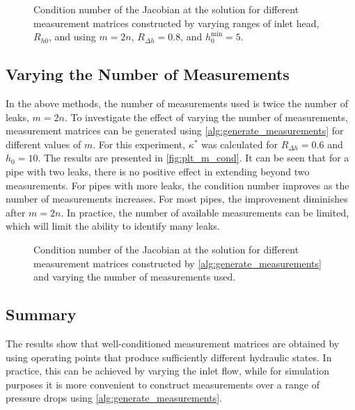 \begin{figure}[ht]
    \centering
    
    \caption[Condition number at the solution for different ranges of inlet head]{Condition number of the Jacobian at the solution for different measurement matrices constructed by varying ranges of inlet head, $R_{h0}$, and using $m=2n$, $R_{\Delta h}=0.8$, and $h_0^{\min}=5$.}
    \label{fig:plt_Rh0_cond}
\end{figure}

\subsection{Varying the Number of Measurements}

In the above methods, the number of measurements used is twice the number of leaks, $m=2n$. To investigate the effect of varying the number of measurements, measurement matrices can be generated using \autoref{alg:generate_measurements} for different values of $m$. For this experiment, $\kappa^*$ was calculated for $R_{\Delta h} = 0.6$ and $h_0=10$. The results are presented in \autoref{fig:plt_m_cond}. It can be seen that for a pipe with two leaks, there is no positive effect in extending beyond two measurements. For pipes with more leaks, the condition number improves as the number of measurements increases. For most pipes, the improvement diminishes after $m=2n$. In practice, the number of available measurements can be limited, which will limit the ability to identify many leaks. 


\begin{figure}[ht]
    \centering
    
    \caption[Condition number at the solution for different numbers of measurements]{Condition number of the Jacobian at the solution for different measurement matrices constructed by \autoref{alg:generate_measurements} and varying the number of measurements used.}
    \label{fig:plt_m_cond}
\end{figure}

\subsection{Summary}

The results show that well-conditioned measurement matrices are obtained by using operating points that produce sufficiently different hydraulic states. In practice, this can be achieved by varying the inlet flow, while for simulation purposes it is more convenient to construct measurements over a range of pressure drops using \autoref{alg:generate_measurements}.\\


